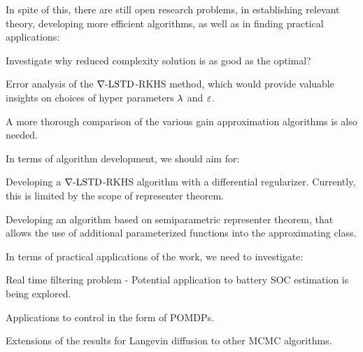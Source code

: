 In spite of this, there are still open research problems, in establishing relevant theory, developing more efficient algorithms, as well as in finding practical applications: 
\begin{romannum}
\item Investigate why reduced complexity solution is as good as the optimal?
\item Error analysis of the $\nabla\text{-LSTD}$-RKHS method, which would provide valuable insights on choices of hyper parameters $\lambda$ and $\varepsilon$.
\item A more thorough comparison of the various gain approximation algorithms is also needed.
\end{romannum}

In terms of algorithm development, we should aim for:
\begin{romannum}
\item Developing a $\nabla\text{-LSTD}$-RKHS algorithm with a differential regularizer. Currently, this is limited by the scope of representer theorem. 
\item Developing an algorithm based on semiparametric representer theorem, that allows the use of additional parameterized functions into the approximating class.
\end{romannum}
In terms of practical applications of the work, we need to investigate:
\begin{romannum}
\item  Real time filtering problem - Potential application to battery SOC estimation is being explored. 
\item Applications to control in the form of POMDPs.
\item Extensions of the results for Langevin diffusion to other MCMC algorithms.
\end{romannum}

